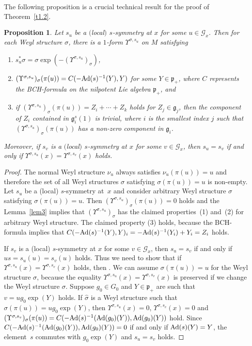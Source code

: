 \documentclass[pdftex]{sigma}
\newcommand{\si}{\sigma}
\newcommand{\ba}{\mathcal{G}}
\newcommand{\fg}{\mathfrak g}
\newcommand{\fp}{\mathfrak p}
\newcommand{\Ad}{{\rm Ad}}
\newcommand{\U}{\Upsilon}
\numberwithin{equation}{section}
\newtheorem{Proposition}[Theorem]{Proposition}
 { \theoremstyle{definition}
\newtheorem{Definition}[Theorem]{Definition}
\newtheorem{Example}[Theorem]{Example}
\newtheorem{Remark}[Theorem]{Remark} }
\begin{document}
The following proposition is a crucial technical result for the proof of Theorem~\ref{t1.2}.

\begin{Proposition} \label{auto-action}
Let $s_u$ be a $($local$)$ $s$-symmetry at $x$ for some $u \in \ba_x$. Then for each Weyl structure $\si$, there is a $1$-form $\U^{\si,s_u}$ on $M$ satisfying
\begin{enumerate}\itemsep=0pt
\item[$1)$] $s_u^*\si=\si\exp(-(\U^{\si,s_u})_\si)$,
\item[$2)$] $(\U^{\si,s_u})_\si(\pi(u))=C(-\Ad(s)^{-1}(Y),Y)$ for some $Y\in \fp_+$,
where $C$ represents the BCH-formula on the nilpotent Lie algebra $\fp_+$, and
\item[$3)$] if $(\U^{\si,s_u})_\si(\pi(u))=Z_{i}+\cdots+Z_k$ holds for $Z_{j}\in \fg_j$, then the component of $Z_{i}$ contained in $\fg_i^s(1)$ is trivial, where $i$ is the smallest index $j$ such that $(\U^{\si,s_u})_\si(\pi(u))$ has a non-zero component in $\fg_i$.
\end{enumerate}
Moreover, if $s_v$ is a $($local$)$ $s$-symmetry at $x$ for some $v\in \ba_x$, then $s_u=s_v$ if and only if $\U^{\si,s_u}(x)=\U^{\si,s_v}(x)$ holds.
\end{Proposition}
\begin{proof}
The normal Weyl structure $\nu_u$ always satisf\/ies $\nu_u(\pi(u))=u$ and therefore the set of all Weyl structures $\si$ satisfying $\si(\pi(u))=u$ is non-empty. Let $s_u$ be a (local) $s$-symmetry at~$x$ and consider arbitrary Weyl structure $\si$ satisfying $\si(\pi(u))=u$. Then $(\U^{\si,s_u})_\si(\pi(u))=0$ holds and the Lemma~\ref{lem3} implies that $(\U^{\si,s_u})_\si$ has the claimed properties~(1) and~(2) for arbitrary Weyl structure. The claimed property (3) holds, because the BCH-formula implies that $C(-\Ad(s)^{-1}(Y),Y)_i=-\Ad(s)^{-1}(Y_i)+Y_i=Z_i$ holds.

If $s_v$ is a (local) $s$-symmetry at $x$ for some $v\in \ba_x$, then $s_u=s_v$ if and only if $us=s_u(u)=s_v(u)$ holds. Thus we need to show that if $\U^{\si,s_u}(x)=\U^{\si,s_v}(x)$ holds, then . We can assume $\si(\pi(u))=u$ for the Weyl structure $\si$, because the equality $\U^{\si,s_u}(x)=\U^{\si,s_v}(x)$ is preserved if we change the Weyl structure $\si$. Suppose $g_0\in G_0$ and $Y\in \fp_+$ are such that $v=ug_0\exp(Y)$ holds. If $\hat \si$ is a Weyl structure such that $\hat \si(\pi(u))=ug_0\exp(Y)$, then $\U^{\si,s_u}(x)= 0$, $\U^{\hat \si,s_v}(x)=0$ and $(\U^{\si,s_v})_\si(\pi(u))=C(-\Ad(s)^{-1}(\Ad(g_0)(Y)),\Ad(g_0)(Y))$ hold. Since $C(-\Ad(s)^{-1}(\Ad(g_0)(Y)),\Ad(g_0)(Y))=0$ if and only if $\Ad(s)(Y)=Y$, the element~$s$ commutes with $g_0\exp(Y)$ and $s_u=s_v$ holds.
\end{proof}
\end{document}
